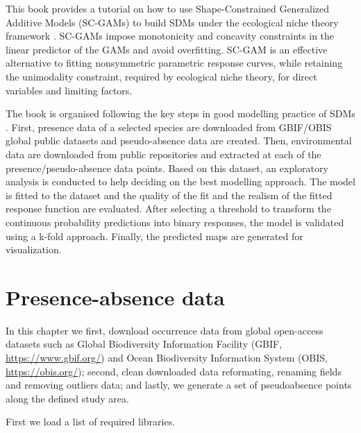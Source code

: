 \documentclass[
]{book}
\begin{document}
This book provides a tutorial on how to use Shape-Constrained Generalized Additive Models (SC-GAMs) to build SDMs under the ecological niche theory framework \citep{citores_etal_2020}. SC-GAMs impose monotonicity and concavity constraints in the linear predictor of the GAMs and avoid overfitting. SC-GAM is an effective alternative to fitting nonsymmetric parametric response curves, while retaining the unimodality constraint, required by ecological niche theory, for direct variables and limiting factors.

The book is organised following the key steps in good modelling practice of SDMs \citep{elith_etal_2009}. First, presence data of a selected species are downloaded from GBIF/OBIS global public datasets and pseudo-absence data are created. Then, environmental data are downloaded from public repositories and extracted at each of the presence/pseudo-absence data points. Based on this dataset, an exploratory analysis is conducted to help deciding on the best modelling approach. The model is fitted to the dataset and the quality of the fit and the realism of the fitted response function are evaluated. After selecting a threshold to transform the continuous probability predictions into binary responses, the model is validated using a k-fold approach. Finally, the predicted maps are generated for visualization.

\hypertarget{presence-absence-data}{%
\chapter{Presence-absence data}\label{presence-absence-data}}

In this chapter we first, download occurrence data from global open-access datasets such as Global Biodiversity Information Facility (GBIF, \url{https://www.gbif.org/}) and Ocean Biodiversity Information System (OBIS, \url{https://obis.org/}); second, clean downloaded data reformating, renaming fields and removing outliers data; and lastly, we generate a set of pseudoabsence points along the defined study area.

First we load a list of required libraries.
\end{document}
